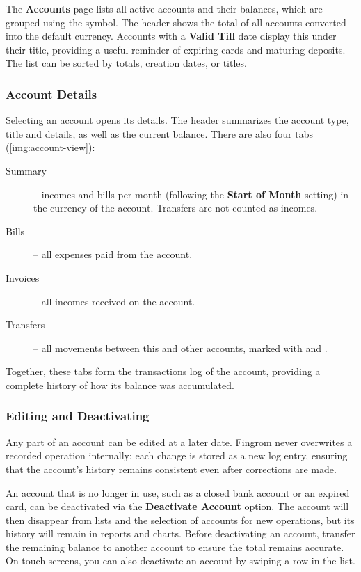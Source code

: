 The \textbf{Accounts} page lists all active accounts and their balances, which are grouped
using the \q{/} symbol. The header shows the total of all accounts converted into the default
currency. Accounts with a \textbf{Valid Till} date display this under their title, providing
a useful reminder of expiring cards and maturing deposits. The list can be sorted by totals,
creation dates, or titles.


\subsubsection{Account Details}

Selecting an account opens its details. The header summarizes the account type, title and
details, as well as the current balance. There are also four tabs (\cref{img:account-view}):


\begin{description}
  \item[Summary] -- incomes and bills per month (following the \textbf{Start of Month}
  setting) in the currency of the account. Transfers are not counted as incomes.
  \item[Bills] -- all expenses paid from the account.
  \item[Invoices] -- all incomes received on the account.
  \item[Transfers] -- all movements between this and other accounts, marked with 
  and .
\end{description}

\noindent Together, these tabs form the transactions log of the account, providing a complete
history of how its balance was accumulated.

\subsubsection{Editing and Deactivating}

Any part of an account can be edited at a later date. Fingrom never overwrites a recorded
operation internally: each change is stored as a new log entry, ensuring that the account's
history remains consistent even after corrections are made.

An account that is no longer in use, such as a closed bank account or an expired card, can be
deactivated via the \textbf{Deactivate Account} option. The account will then disappear from
lists and the selection of accounts for new operations, but its history will remain in
reports and charts. Before deactivating an account, transfer the remaining balance to another
account to ensure the total remains accurate. On touch screens, you can also deactivate an
account by swiping a row in the list.


